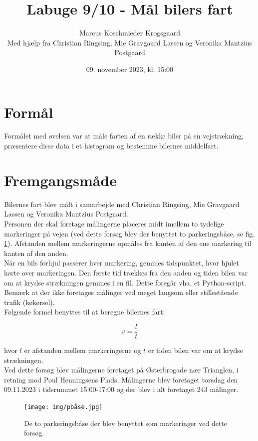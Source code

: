 \documentclass[hidelinks]{article}
\title{Labuge 9/10 - Mål bilers fart}
\author{Marcus Koschmieder Krogsgaard\\
\small Med hjælp fra Christian Ringsing, Mie Gravgaard Lassen og Veronika Mantzius Postgaard}
\date{09. november 2023, kl. 15:00}
\begin{document}
\maketitle

\newpage

\section{Formål}
Formålet med øvelsen var at måle farten af en række biler på en vejstrækning, præsentere disse data i et histogram og bestemme bilernes middelfart.

\section{Fremgangsmåde} \label{fremgangsmaade}
Bilernes fart blev målt i samarbejde med Christian Ringsing, Mie Gravgaard Lassen og Veronika Mantzius Postgaard.\\

Personen der skal foretage målingerne placeres midt imellem to tydelige markeringer på vejen (ved dette forsøg blev der benyttet to parkeringsbåse, se fig. \ref{fig:pplads}). Afstanden mellem markeringerne opmåles fra kanten af den ene markering til kanten af den anden.\\

Når en bils forhjul passerer hver markering, gemmes tidspunktet, hvor hjulet kørte over markeringen. Den første tid trækkes fra den anden og tiden bilen var om at krydse strækningen gemmes i en fil. Dette foregår vha. et Python-script\cite{timescript}. Bemærk at der ikke foretages målinger ved meget langsom eller stillestående trafik (køkørsel).\\

Følgende formel benyttes til at beregne bilernes fart:

\[v = \frac{l}{t}\]

hvor $l$ er afstanden mellem markeringerne og $t$ er tiden bilen var om at krydse strækningen.\\

Ved dette forsøg blev målingerne foretaget på Østerbrogade nær Trianglen, i retning mod Poul Henningsens Plads. Målingerne blev foretaget torsdag den 09.11.2023 i tidsrummet 15:00-17:00 og der blev i alt foretaget 243 målinger.\\

\begin{figure}[H]
    \centering
    \texttt{[image: img/pbåse.jpg]}
    \caption{De to parkeringsbåse der blev benyttet som markeringer ved dette forsøg.}
    \label{fig:pplads}
\end{figure}
\end{document}
